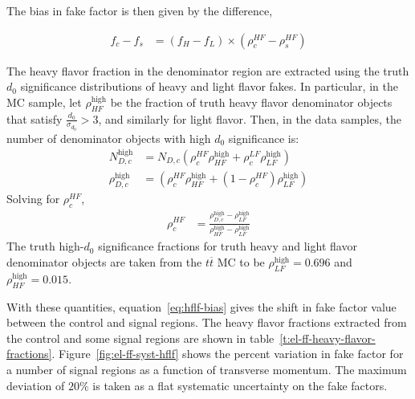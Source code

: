   The bias in fake factor is then given by the difference,

  \begin{align}\label{eq:hflf-bias}
    f_c - f_s &= (f_H - f_L) \times (\rho_c^{HF} - \rho_s^{HF})
  \end{align}

  The heavy flavor fraction in the denominator region are extracted using the truth $d_0$ significance distributions of heavy and light flavor fakes. In particular, in the MC sample, let $\rho_{HF}^{\textrm{high}}$ be the fraction of truth heavy flavor denominator objects that satisfy $\frac{d_0}{\sigma_{d_0}} > 3$, and similarly for light flavor. Then, in the data samples, the number of denominator objects with high $d_0$ significance is:
    \begin{align}
      N_{D, c}^{\textrm{high}} &= N_{D,c} \left( \rho_{c}^{HF} \rho_{HF}^{\textrm{high}} +  \rho_{c}^{LF} \rho_{LF}^{\textrm{high}} \right)\\ 
      \rho_{D,c}^{\textrm{high}}&= \left( \rho_{c}^{HF} \rho_{HF}^{\textrm{high}} +  (1-\rho_{c}^{HF}) \rho_{LF}^{\textrm{high}} \right)
    \end{align}
    Solving for $\rho_c^{HF}$,
    \begin{align}
      \rho_c^{HF} &= \frac{\rho_{D,c}^{\textrm{high}} - \rho_{LF}^{\textrm{high}}}{\rho_{HF}^{\textrm{high}} - \rho_{LF}^{\textrm{high}}}
    \end{align}
    The truth high-$d_0$ significance fractions for truth heavy and light flavor denominator objects are taken from the $t\overline{t}$ MC to be $\rho_{LF}^{\textrm{high}}=0.696$ and $\rho_{HF}^{\textrm{high}}=0.015$. 

  With these quantities, equation~\ref{eq:hflf-bias} gives the shift in fake factor value between the control and signal regions. The heavy flavor fractions extracted from the control and some signal regions are shown in table~\ref{t:el-ff-heavy-flavor-fractions}. Figure~\ref{fig:el-ff-syst-hflf} shows the percent variation in fake factor for a number of signal regions as a function of transverse momentum. The maximum deviation of $20\%$ is taken as a flat systematic uncertainty on the fake factors. 

